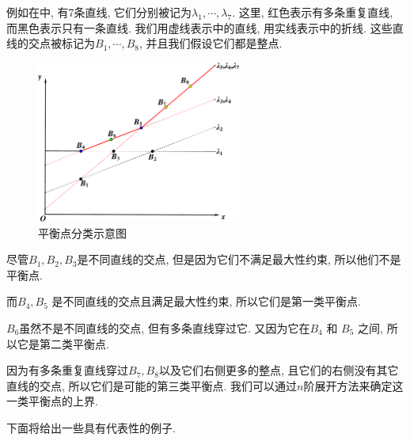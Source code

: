 例如在中, 有7条直线, 它们分别被记为$\lambda_1,\cdots,\lambda_7$. 这里, 红色表示有多条重复直线, 而黑色表示只有一条直线. 我们用虚线表示中的直线, 用实线表示中的折线. 这些直线的交点被标记为$B_1,\cdots,B_8$, 并且我们假设它们都是整点. 
\begin{figure}[htbp]
\centering
\includegraphics[width=0.6\textwidth]{fig/ps.pdf}
\caption{平衡点分类示意图}
\label{point}
\end{figure}
\begin{compactitem}[\textbullet]
\item 尽管$B_1,B_2,B_3$是不同直线的交点, 但是因为它们不满足最大性约束, 所以他们不是平衡点. 
\item 而$B_4,B_5$ 是不同直线的交点且满足最大性约束, 所以它们是第一类平衡点.
\item $B_6$虽然不是不同直线的交点, 但有多条直线穿过它. 又因为它在$B_4$ 和 $B_5$ 之间, 所以它是第二类平衡点.
\item 因为有多条重复直线穿过$B_7,B_8$以及它们右侧更多的整点, 且它们的右侧没有其它直线的交点, 所以它们是可能的第三类平衡点. 我们可以通过$n$阶展开方法来确定这一类平衡点的上界.
\end{compactitem}

下面将给出一些具有代表性的例子. 


